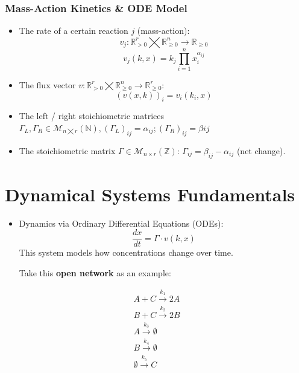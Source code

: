 \documentclass[aspectratio=169]{beamer}
\begin{document}
\begin{frame}{\insertsectionhead}
	\frametitle{Mass-Action Kinetics \& ODE Model}
	\begin{itemize}
		\item The \alert{rate} of a certain reaction $j$ (mass-action):
			$$ 	v_j : \mathbb{R}^r_{> 0} \bigtimes \mathbb{R}^n_{\geq 0} \rightarrow \mathbb{R}_{\geq 0}   $$
			$$ v_j(k,x) = k_j \prod_{i=1}^{n} x_i^{\alpha_{ij}} $$

		\item The \alert{flux vector} $v : \mathbb{R}^r_{> 0}  \bigtimes \mathbb{R}^n_{\geq 0} \rightarrow \mathbb{R}^r_{\geq 0}$:
			$$ 	(v(x,k))_{i} = v_i(k_i, x)$$
		\item The \alert{left / right stoichiometric matrices} $		\Gamma_L, \Gamma_R \in \mathcal{M}_{n \bigtimes r}(\mathbb{N}), 		(\Gamma_L)_{ij} = \alpha_{ij};
			(\Gamma_R)_{ij} = \beta{ij} $
		\item The \alert{stoichiometric matrix} $\Gamma \in \mathcal{M}_{n \times r}(\mathbb{Z})$: $\Gamma_{ij} = \beta_{ij} - \alpha_{ij}$ (net change).

	\end{itemize}
\end{frame}

\section{Dynamical Systems Fundamentals}

\begin{frame}
	\begin{itemize}
		\item Dynamics via Ordinary Differential Equations (ODEs):
			$$ \frac{dx}{dt} = \Gamma \cdot v(k,x) $$
			This system models how concentrations change over time.

			Take this \textbf{open network} as an example:
	\end{itemize}
	\begin{align*}
		A + C \xrightarrow{k_{1}} 2A \\
		B + C \xrightarrow{k_{2}} 2B  \\
		A \xrightarrow{k_{3}} \emptyset \\
		B \xrightarrow{k_{4}} \emptyset \\
		\emptyset \xrightarrow{k_{5}} C
	\end{align*}
\end{frame}
\end{document}
